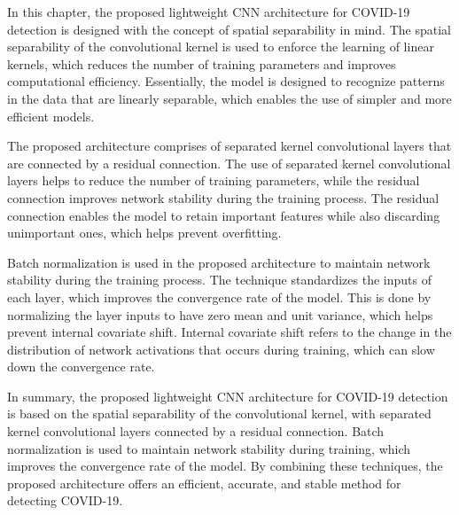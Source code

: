 In this chapter, the proposed lightweight CNN architecture for COVID-19 detection is designed with the concept of spatial separability in mind. The spatial separability of the convolutional kernel is used to enforce the learning of linear kernels, which reduces the number of training parameters and improves computational efficiency. Essentially, the model is designed to recognize patterns in the data that are linearly separable, which enables the use of simpler and more efficient models.

The proposed architecture comprises of separated kernel convolutional layers that are connected by a residual connection. The use of separated kernel convolutional layers helps to reduce the number of training parameters, while the residual connection improves network stability during the training process. The residual connection enables the model to retain important features while also discarding unimportant ones, which helps prevent overfitting.

Batch normalization is used in the proposed architecture to maintain network stability during the training process. The technique standardizes the inputs of each layer, which improves the convergence rate of the model. This is done by normalizing the layer inputs to have zero mean and unit variance, which helps prevent internal covariate shift. Internal covariate shift refers to the change in the distribution of network activations that occurs during training, which can slow down the convergence rate.

In summary, the proposed lightweight CNN architecture for COVID-19 detection is based on the spatial separability of the convolutional kernel, with separated kernel convolutional layers connected by a residual connection. Batch normalization is used to maintain network stability during training, which improves the convergence rate of the model. By combining these techniques, the proposed architecture offers an efficient, accurate, and stable method for detecting COVID-19.